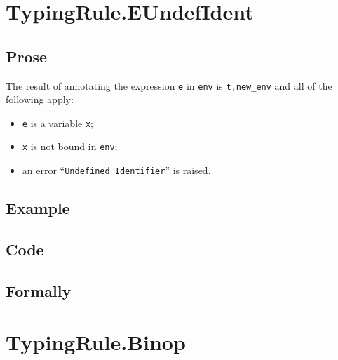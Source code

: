 \documentclass{book}
\begin{document}
\section{TypingRule.EUndefIdent \label{sec:TypingRule.EUndefIdent}}

  \subsection{Prose}
  The result of annotating the expression \texttt{e} in \texttt{env} is
\texttt{t,new\_env} and all of the following apply:
  \begin{itemize}
  \item \texttt{e} is a variable \texttt{x};
  \item \texttt{x} is not bound in \texttt{env};
  \item an error ``\texttt{Undefined Identifier}'' is raised.
  \end{itemize}

  \subsection{Example}

  \subsection{Code}

\begin{emptyformal}
  \subsection{Formally}
\begin{comment}
ROMAN: I don't think we need this, since errors are implicit when typing fails.
\end{comment}
\end{emptyformal}


\section{TypingRule.Binop \label{sec:TypingRule.Binop}}
\end{document}
